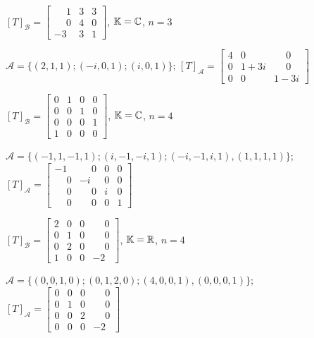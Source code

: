 \documentclass[12pt]{exam}
\begin{document}
\begin{exercicio}
    $[T]_\mathcal{B} = \begin{bmatrix} \phantom{-} 1 & 3 & 3\\ \phantom{-} 0 & 4 & 0\\ -3 & 3 & 1\end{bmatrix}$, $\mathbb{K} = \mathbb{C}$, $n = 3$

    \begin{solucao}
        $\mathcal{A} = \{(2,1,1);(-i,0,1);(i,0,1)\}$; $[T]_\mathcal{A} = \begin{bmatrix} 4 & 0 & \phantom{-} 0\\ 0 & 1 + 3i & \phantom{-} 0\\ 0 & 0 & 1 - 3i\end{bmatrix}$
    \end{solucao}
\end{exercicio}

\begin{exercicio}
    $[T]_\mathcal{B} = \begin{bmatrix} 0 & 1 & 0 & 0\\ 0 & 0 & 1 & 0\\ 0 & 0 & 0 & 1 \\ 1 & 0 & 0 & 0\end{bmatrix}$, $\mathbb{K} = \mathbb{C}$, $n = 4$

    \begin{solucao}
        $\mathcal{A} = \{(-1,1,-1,1); (i,-1,-i,1); (-i,-1,i,1), (1,1,1,1)\}$; $[T]_\mathcal{A} = \begin{bmatrix} -1 & \phantom{-}0 & 0 & 0\\ \phantom{-} 0 & -i & 0 & 0\\ \phantom{-} 0 & \phantom{-}0 & i & 0\\ \phantom{-}0 & \phantom{-}0 & 0 & 1\end{bmatrix}$
    \end{solucao}
\end{exercicio}

\begin{exercicio}\label{fimdiagonalizacao}
    $[T]_\mathcal{B} = \begin{bmatrix} 2 & 0 & 0 & \phantom{-}0\\ 0 & 1 & 0 & \phantom{-}0\\ 0 & 2 & 0 & \phantom{-}0 \\ 1 & 0 & 0 & -2\end{bmatrix}$, $\mathbb{K} = \mathbb{R}$, $n = 4$

    \begin{solucao}
        $\mathcal{A} = \{(0,0,1,0); (0,1,2,0); (4,0,0,1), (0,0,0,1)\}$; $[T]_\mathcal{A} = \begin{bmatrix} 0 & 0 & 0 & \phantom{-}0\\ 0 & 1 & 0 & \phantom{-}0\\0 & 0 & 2 & \phantom{-}0\\0 & 0 & 0 & -2\end{bmatrix}$
    \end{solucao}
\end{exercicio}
\end{document}
